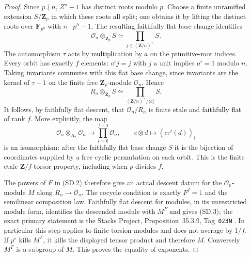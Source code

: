 \begin{proof}
Since $p\nmid n$, $Z^n-1$ has distinct roots modulo $p$.
Choose a finite unramified extension $S/\mathbf Z_p$ in which
these roots all split; one obtains it by lifting the distinct
roots over $\mathbf F_{p^h}$ with $n\mid p^h-1$.
The resulting faithfully flat base change identifies
\[
 \mathcal O_n\otimes_{\mathbf Z_p}S
                    \simeq\prod_{j\in(\mathbf Z/n)^\times} S.
 \tag{SD.4}
\]
The automorphism $\tau$ acts by multiplication by $a$ on the
primitive-root indices.  Every orbit has exactly $f$ elements:
$a^ij=j$ with $j$ a unit implies $a^i=1$ modulo $n$.
Taking invariants commutes with this flat base change, since
invariants are the kernel of $\tau-1$ on the finite free
$\mathbf Z_p$-module $\mathcal O_n$.  Hence
\[
 R_n\otimes_{\mathbf Z_p}S
       \simeq\prod_{(\mathbf Z/n)^\times/\langle a\rangle}S.
 \tag{SD.5}
\]
It follows, by faithfully flat descent, that
$\mathcal O_n/R_n$ is finite etale and faithfully flat of
rank $f$.  More explicitly, the map
\[
 \mathcal O_n\otimes_{R_n}\mathcal O_n
       \longrightarrow\prod_{i=0}^{f-1}\mathcal O_n,
 \qquad c\otimes d\longmapsto(c\tau^i(d))_i
 \tag{SD.6}
\]
is an isomorphism: after the faithfully flat base change $S$
it is the bijection of coordinates supplied by a free cyclic
permutation on each orbit.  This is the finite etale
$\mathbf Z/f$-torsor property, including when $p$ divides $f$.

The powers of $F$ in (SD.2) therefore give an actual descent
datum for the $\mathcal O_n$-module $M$ along $R_n\to\mathcal O_n$.
The cocycle condition is exactly $F^f=1$ and the semilinear
composition law.  Faithfully flat descent for modules, in its
unrestricted module form, identifies the descended module with
$M^F$ and gives (SD.3); the exact primary statement is the
Stacks Project, Proposition~35.3.9, Tag~\texttt{023N}
\cite{Stacks023N}.  In particular this step applies to finite
torsion modules and does not average by $1/f$.
If $p^e$ kills $M^F$, it kills the displayed tensor product and
therefore $M$.  Conversely $M^F$ is a subgroup of $M$.
This proves the equality of exponents.
\end{proof}


